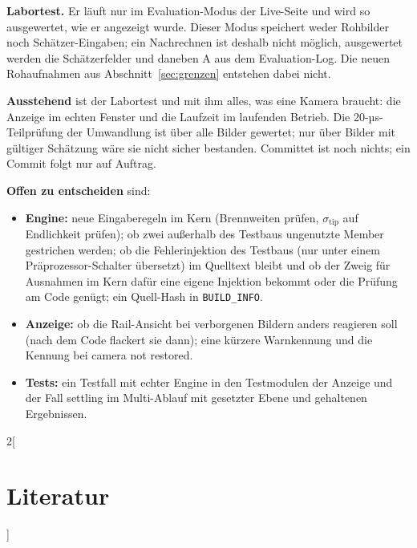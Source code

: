 \documentclass[11pt,a4paper,fleqn]{article}
\newcommand{\stip}{\sigma_{\mathrm{tip}}}
\newcommand{\code}[1]{\texttt{#1}}
\begin{document}
\textbf{Labortest.} Er läuft nur im Evaluation-Modus der Live-Seite und wird so ausgewertet, wie er angezeigt wurde.
Dieser Modus speichert weder Rohbilder noch Schätzer-Eingaben; ein Nachrechnen ist deshalb nicht möglich, ausgewertet
werden die Schätzerfelder und daneben A aus dem Evaluation-Log. Die neuen Rohaufnahmen aus
Abschnitt~\ref{sec:grenzen} entstehen dabei nicht.

\textbf{Ausstehend} ist der Labortest und mit ihm alles, was eine Kamera braucht: die Anzeige im echten Fenster und
die Laufzeit im laufenden Betrieb. Die 20-µs-Teilprüfung der Umwandlung ist über alle Bilder gewertet; nur über Bilder
mit gültiger Schätzung wäre sie nicht sicher bestanden. Committet ist noch nichts; ein Commit folgt nur auf Auftrag.

\textbf{Offen zu entscheiden} sind:
\begin{itemize}
  \item \textbf{Engine:} neue Eingaberegeln im Kern (Brennweiten prüfen, $\stip$ auf Endlichkeit prüfen); ob zwei
        außerhalb des Testbaus ungenutzte Member gestrichen werden; ob die Fehlerinjektion des Testbaus (nur unter
        einem Präprozessor-Schalter übersetzt) im Quelltext bleibt und ob der Zweig für Ausnahmen im Kern dafür eine
        eigene Injektion bekommt oder die Prüfung am Code genügt; ein Quell-Hash in \code{BUILD\_INFO}.
  \item \textbf{Anzeige:} ob die Rail-Ansicht bei verborgenen Bildern anders reagieren soll (nach dem Code flackert
        sie dann); eine kürzere Warnkennung und die Kennung bei \glqq camera not restored\grqq.
  \item \textbf{Tests:} ein Testfall mit echter Engine in den Testmodulen der Anzeige und der Fall \glqq
        settling\grqq{} im Multi-Ablauf mit gesetzter Ebene und gehaltenen Ergebnissen.
\end{itemize}

\begin{otherlanguage}{english}
\begin{multicols}{2}[\section*{Literatur}]
\footnotesize


\end{multicols}
\end{otherlanguage}
\end{document}
